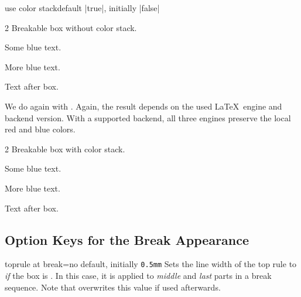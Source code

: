 \begin{docTcbKey}[][doc new and updated={2020-10-09}{2026-11-11}]{use color stack}{}{default |true|, initially |false|}
\begin{dispExample}
\begin{multicols}{2}\footnotesize
Breakable box without color stack.
\begin{tcolorbox}[enhanced jigsaw,
  size=small, colframe=gray, colback=yellow!10!white, colupper=blue,
  enforce breakable,%
  vfill before first, pad at break=1mm, break at=33mm ]
    Some blue text.\par\smallskip
    {\color{red}\itshape\lipsum[2]}\par\smallskip
    More blue text.
\end{tcolorbox}
Text after box.
\end{multicols}
\end{dispExample}

We do again with . Again, the result depends on
the used \LaTeX\ engine and backend version. With a supported backend,
all three engines preserve the local red and blue colors.

\begin{dispExample}
\begin{multicols}{2}\footnotesize
Breakable box with color stack.
\begin{tcolorbox}[enhanced jigsaw, use color stack,
  size=small, colframe=gray, colback=yellow!10!white, colupper=blue,
  enforce breakable,%
  vfill before first, pad at break=1mm, break at=33mm ]
    Some blue text.\par\smallskip
    {\color{red}\itshape\lipsum[2]}\par\smallskip
    More blue text.
\end{tcolorbox}
Text after box.
\end{multicols}
\end{dispExample}

\end{docTcbKey}




\clearpage
\subsection{Option Keys for the Break Appearance}

\begin{docTcbKey}{toprule at break}{=}{no default, initially \texttt{0.5mm}}
  Sets the line width of the top rule to  \emph{if} the box is .
  In this case, it is applied to \emph{middle} and \emph{last} parts in a
  break sequence. Note that  overwrites this value
  if used afterwards.
\end{docTcbKey}



